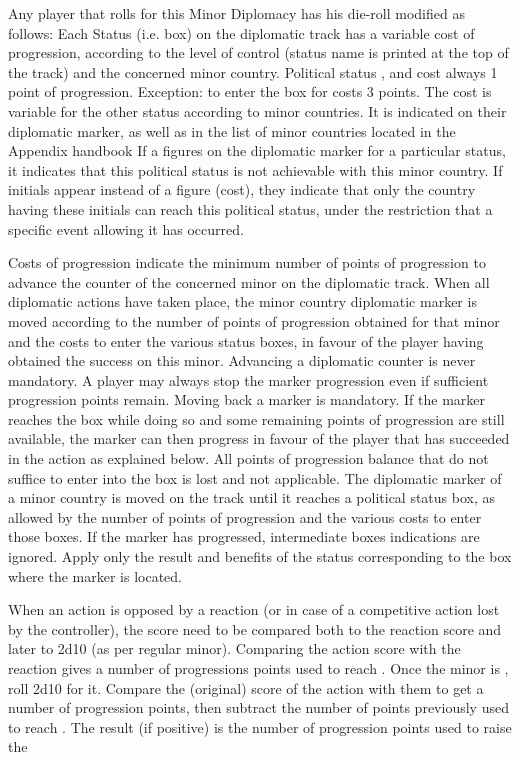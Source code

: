 \aparag[Modifiers] Any player that rolls for this Minor Diplomacy has his
die-roll modified as follows: \diplomod
{}
Each Status (i.e. box) on the diplomatic track has a variable cost of
progression, according to the level of control (status name is printed at the
top of the track) and the concerned minor country.
\bparag Political status \Neutral, \RM and \SUB cost always 1 point of
progression. Exception: to enter the \SUB box for \paysSuisse costs 3 points.
\bparag The cost is variable for the other status according to minor
countries. It is indicated on their diplomatic marker, as well as in the list
of minor countries located in the Appendix handbook
\bparag If a \textetoile figures on the diplomatic marker for a particular
status, it indicates that this political status is not achievable with this
minor country.
\bparag If initials appear instead of a figure (cost), they indicate that only
the country having these initials can reach this political status, under the
restriction that a specific event allowing it has occurred.

Costs of progression indicate the minimum number of points of progression to
advance the counter of the concerned minor on the diplomatic track.
\bparag When all diplomatic actions have taken place, the minor country
diplomatic marker is moved according to the number of points of progression
obtained for that minor and the costs to enter the various status boxes, in
favour of the player having obtained the success on this minor.
\bparag Advancing a diplomatic counter is never mandatory. A player may always
stop the marker progression even if sufficient progression points remain.
\bparag Moving back a marker is mandatory. If the marker reaches the \Neutral
box while doing so and some remaining points of progression are still
available, the marker can then progress in favour of the player that has
succeeded in the action as explained below.
\bparag All points of progression balance that do not suffice to enter into
the box is lost and not applicable.
\bparag The diplomatic marker of a minor country is moved on the track until
it reaches a political status box, as allowed by the number of points of
progression and the various costs to enter those boxes.  If the marker has
progressed, intermediate boxes indications are ignored. Apply only the result
and benefits of the status corresponding to the box where the marker is
located.

When an action is opposed by a reaction (or in case of a competitive action
lost by the controller), the score need to be compared both to the reaction
score and later to 2d10 (as per regular minor).
\bparag Comparing the action score with the reaction gives a number of
progressions points used to reach \Neutral.
\bparag Once the minor is \Neutral, roll 2d10 for it. Compare the (original)
score of the action with them to get a number of progression points, then
subtract the number of points previously used to reach \Neutral. The result
(if positive) is the number of progression points used to raise the

